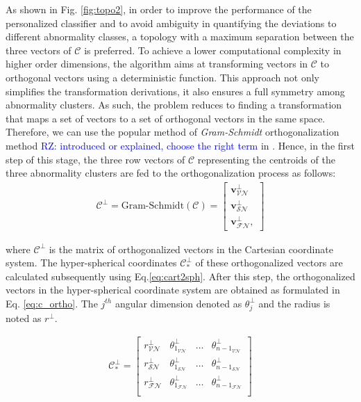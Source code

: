 As shown in Fig. \ref{fig:topo2}, in order to improve the performance of the personalized classifier and to avoid ambiguity in quantifying the deviations to different abnormality classes, a topology with a maximum separation between the three vectors of $\mathcal{C}$ is preferred. To achieve a lower computational complexity in higher order dimensions, the algorithm aims at transforming vectors in $\mathcal{C}$ to orthogonal vectors using a deterministic function. This approach not only simplifies the transformation derivations, it also ensures a full symmetry among abnormality clusters. As such, the problem reduces to finding a transformation that maps a set of vectors to a set of orthogonal vectors in the same space. Therefore, we can use the popular method of \textit{Gram-Schmidt} orthogonalization method \textcolor{blue}{RZ: introduced or explained, choose the right term} in \cite{Gram-schmidth1, Gram-schmidth2}. Hence, in the first step of this stage, the three row vectors of $\mathcal{C}$ representing the centroids of the three abnormality clusters are fed to the orthogonalization process as follows:
\begin{align}
\mathcal{C}^{\perp}= \text{Gram-Schmidt}(\mathcal{C})
=
\begin{bmatrix}
\mathbf{v}_{\mathcal{VN}}^{\perp} \\
\mathbf{v}_{\mathcal{SN}}^{\perp} \\
\mathbf{v}_{\mathcal{FN}}^{\perp},
\end{bmatrix}
\end{align}

where $\mathcal{C}^{\perp}$ is the matrix of orthogonalized vectors in the Cartesian coordinate system. The hyper-spherical coordinates $\mathcal{C}^{\perp}_{*}$ of these orthogonalized vectors are calculated subsequently using Eq.\ref{eq:cart2sph}. After this step, the orthogonalized vectors in the hyper-spherical coordinate system are obtained as formulated in Eq. \ref{eq:c_ortho}. The $j^{th}$ angular dimension denoted as  $\theta_{j}^{\perp}$ and the radius is noted as $r^{\perp}$.%

\begin{align}
\label{eq:c_ortho}
\mathcal{C}^{\perp}_{*} =
\begin{bmatrix}
    r_{\mathcal{VN}}^{\perp} & \theta_{1_{\mathcal{VN}}}^{\perp} & \dots  & \theta_{{n-1}_{\mathcal{VN}}}^{\perp} \\
    r_{\mathcal{SN}}^{\perp} & \theta_{1_{\mathcal{SN}}}^{\perp} & \dots  & \theta_{{n-1}_{\mathcal{SN}}}^{\perp} \\
	r_{\mathcal{FN}}^{\perp} & \theta_{1_{\mathcal{FN}}}^{\perp} & \dots  & \theta_{{n-1}_{\mathcal{FN}}}^{\perp} \\
\end{bmatrix}
\end{align}


